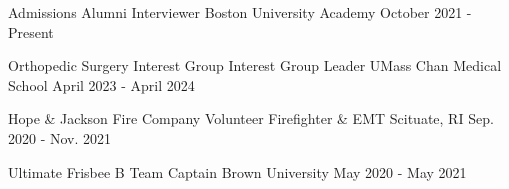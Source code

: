 
\begin{cventries}

\vspace{-1mm}
\cventry
  {Admissions} %
  {Alumni Interviewer} %
  {Boston University Academy} %
  {October 2021 - Present} %
  {}

\cventry
  {Orthopedic Surgery Interest Group} %
  {Interest Group Leader} %
  {UMass Chan Medical School} %
  {April 2023 - April 2024} %
  {}

\cventry
  {Hope \& Jackson Fire Company} %
  {Volunteer Firefighter \& EMT} %
  {Scituate, RI} %
  {Sep. 2020 - Nov. 2021} %
  {}

\cventry
  {Ultimate Frisbee B Team} %
  {Captain} %
  {Brown University} %
  {May 2020 - May 2021} %
  {}

\end{cventries}
